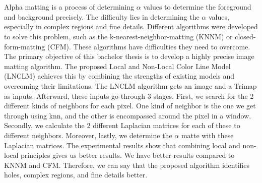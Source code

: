 \section*{}
Alpha matting is a process of determining $\alpha$ values to determine the foreground and background precisely. The difficulty lies in determining the $\alpha$ values, especially in complex regions and fine details. Different algorithms were developed to solve this problem, such as the k-nearest-neighbor-matting (KNNM) or closed-form-matting (CFM). These algorithms have difficulties they need to overcome. 
The primary objective of this bachelor thesis is to develop a highly precise image matting algorithm. The proposed Local and Non-Local Color Line Model (LNCLM) achieves this by combining the strengths of existing models and overcoming their limitations.
The LNCLM algorithm gets an image and a Trimap as inputs. Afterward, these inputs go through 3 stages. First, we search for the 2 different kinds of neighbors for each pixel. One kind of neighbor is the one we get through using knn, and the other is encompassed around the pixel in a window. Secondly, we calculate the 2 different Laplacian matrices for each of these to different neighbors. Moreover, lastly, we determine the $\alpha$ matte with these Laplacian matrices.
The experimental results show that combining local and non-local principles gives us better results. We have better results compared to KNNM and CFM. Therefore, we can say that the proposed algorithm identifies holes, complex regions, and fine details better.

